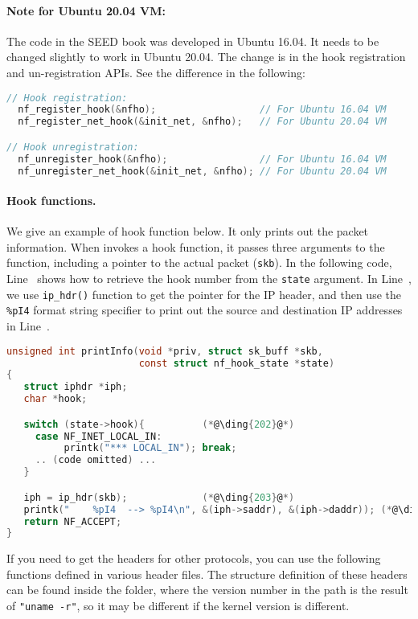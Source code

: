 \paragraph{Note for Ubuntu 20.04 VM:}
The code in the SEED book was developed in Ubuntu 16.04. It needs to be changed slightly 
to work in Ubuntu 20.04. The change is in the hook registration and 
un-registration APIs. See the difference in the following:

\begin{lstlisting}[language=C]
// Hook registration:
  nf_register_hook(&nfho);                  // For Ubuntu 16.04 VM
  nf_register_net_hook(&init_net, &nfho);   // For Ubuntu 20.04 VM

// Hook unregistration:
  nf_unregister_hook(&nfho);                // For Ubuntu 16.04 VM
  nf_unregister_net_hook(&init_net, &nfho); // For Ubuntu 20.04 VM
\end{lstlisting}
 

\paragraph{Hook functions.} We give an example of hook function
below. It only prints out the packet information.
When \netfilter invokes a hook function, it passes
three arguments to the function, including a pointer to the 
actual packet (\texttt{skb}). 
In the following code, Line~ shows how to retrieve 
the hook number from the \texttt{state} argument. 
In Line~, we use \texttt{ip\_hdr()} function
to get the pointer for the IP header,
and then use the \texttt{\%pI4} format string specifier
to print out the source and destination 
IP addresses in Line~.

\begin{lstlisting}[language=C, caption={An example of hook function}]
unsigned int printInfo(void *priv, struct sk_buff *skb,   
                       const struct nf_hook_state *state)
{
   struct iphdr *iph;
   char *hook;

   switch (state->hook){          (*@\ding{202}@*)
     case NF_INET_LOCAL_IN: 
          printk("*** LOCAL_IN"); break;
     .. (code omitted) ...
   }

   iph = ip_hdr(skb);             (*@\ding{203}@*)           
   printk("    %pI4  --> %pI4\n", &(iph->saddr), &(iph->daddr)); (*@\ding{204}@*)
   return NF_ACCEPT;
}
\end{lstlisting}

If you need to get the headers for other protocols, you can use the following
functions defined in various header files. The  
structure definition of these headers can be found 
inside the  
folder, where the version number in the path is the result 
of \texttt{"uname -r"}, so it may be different if the kernel version
is different. 


